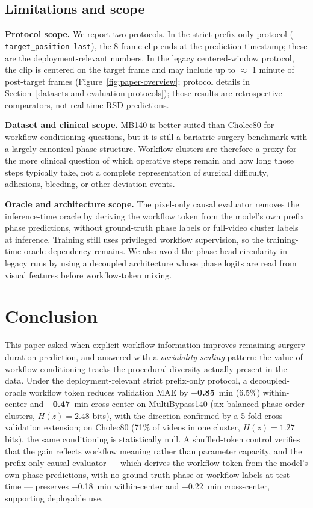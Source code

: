 \subsection{Limitations and scope}\label{limitations-and-scope}

\textbf{Protocol scope.} We report two protocols. In the strict
prefix-only protocol (\texttt{-\/-target\_position\ last}), the 8-frame
clip ends at the prediction timestamp; these are the deployment-relevant
numbers. In the legacy centered-window protocol, the clip is centered on
the target frame and may include up to $\approx$ 1 minute of post-target
frames (Figure~\ref{fig:paper-overview}; protocol details in
Section~\ref{datasets-and-evaluation-protocols}); those results are
retrospective comparators, not real-time RSD predictions.

\textbf{Dataset and clinical scope.} MB140 is better suited than
Cholec80 for workflow-conditioning questions, but it is still a
bariatric-surgery benchmark with a largely canonical phase structure.
Workflow clusters are therefore a proxy for the more clinical question
of which operative steps remain and how long those steps typically take,
not a complete representation of surgical difficulty, adhesions,
bleeding, or other deviation events.

\textbf{Oracle and architecture scope.} The pixel-only causal evaluator
removes the inference-time oracle by deriving the workflow token from the
model's own prefix phase predictions, without ground-truth phase labels
or full-video cluster labels at inference. Training still uses
privileged workflow supervision, so the training-time oracle dependency
remains. We also avoid the phase-head circularity in legacy runs by
using a decoupled architecture whose phase logits are read from visual
features before workflow-token mixing.

\section{Conclusion}\label{conclusion}

This paper asked when explicit workflow information improves
remaining-surgery-duration prediction, and answered with a
\emph{variability-scaling} pattern: the value of workflow conditioning
tracks the procedural diversity actually present in the data. Under the
deployment-relevant strict prefix-only protocol, a decoupled-oracle
workflow token reduces validation MAE by \textbf{$-$0.85}~min
(6.5\%) within-center and \textbf{$-$0.47}~min cross-center on
MultiBypass140 (six balanced phase-order clusters, $H(z) = 2.48$ bits),
with the direction confirmed by a 5-fold cross-validation extension;
on Cholec80 (71\% of videos in one cluster, $H(z) = 1.27$ bits), the
same conditioning is statistically null. A shuffled-token control
verifies that the gain reflects workflow meaning rather than parameter
capacity, and the prefix-only causal evaluator --- which derives the
workflow token from the model's own phase predictions, with no
ground-truth phase or workflow labels at test time --- preserves
$-$0.18~min within-center and $-$0.22~min cross-center, supporting
deployable use.

